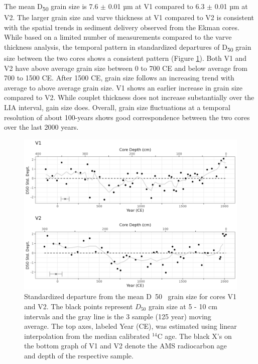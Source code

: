 \documentclass[Royal,times,doublespace,sageh]{sagej}
\begin{document}
The mean D\textsubscript{50} grain size is 7.6 \(\pm\) 0.01 µm at V1
compared to 6.3 \(\pm\) 0.01 µm at V2. The larger grain size and varve
thickness at V1 compared to V2 is consistent with the spatial trends in
sediment delivery observed from the Ekman cores. While based on a
limited number of measurements compared to the varve thickness analysis,
the temporal pattern in standardized departures of D\textsubscript{50}
grain size between the two cores shows a consistent pattern (Figure
\ref{fig:particle}). Both V1 and V2 have above average grain size
between 0 to 700 CE and below average from 700 to 1500 CE. After 1500
CE, grain size follows an increasing trend with average to above average
grain size. V1 shows an earlier increase in grain size compared to V2.
While couplet thickness does not increase substantially over the LIA
interval, gain size does. Overall, grain size fluctuations at a temporal
resolution of about 100-years shows good correspondence between the two
cores over the last 2000 years.

\begin{figure}

{\centering \includegraphics[width=1\linewidth]{figs/V1_V2_grainsize_vs_depth_and_C14_est_yr} 

}

\caption{Standardized departure from the mean D~50~ grain size for cores V1 and V2. The black points represent $D_{50}$ grain size at 5 - 10 cm intervals and the gray line is the 3 sample (125 year) moving average. The top axes, labeled Year (CE), was estimated using linear interpolation from the median calibrated $^{14}$C age. The black X's on the bottom graph of V1 and V2 denote the AMS radiocarbon age and depth of the respective sample.\label{particle}}\label{fig:particle}
\end{figure}
\end{document}
